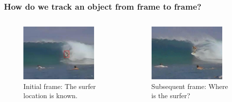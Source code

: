 
\begin{frame}
    \frametitle{How do we track an object from frame to frame?}
    \begin{columns}[T]
        \begin{column}{0.5\textwidth}
            \begin{figure}
                \includegraphics[width=0.9\textwidth]{surfer_marked}
                \caption{Initial frame: The surfer location is known.}
            \end{figure}
        \end{column}
        \begin{column}{0.5\textwidth}
            \begin{figure}
                \includegraphics[width=0.9\textwidth]{surfer_unmarked}
                \caption{Subsequent frame: Where is the surfer?}
            \end{figure}
        \end{column}
    \end{columns}
\end{frame}

